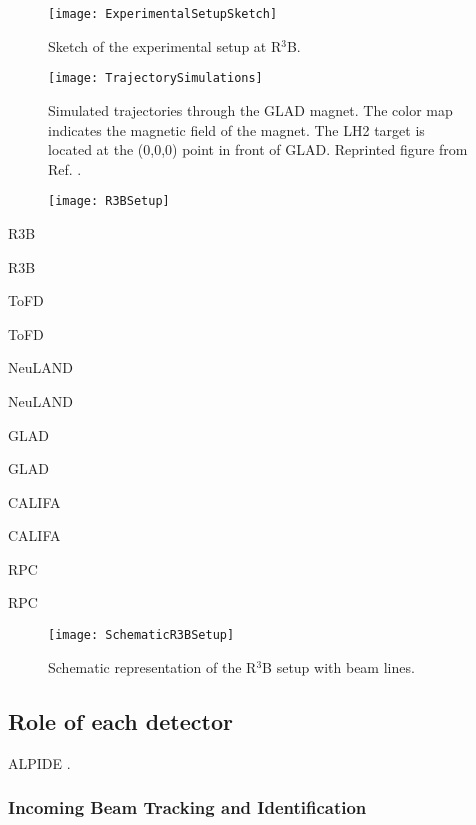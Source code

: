 \begin{figure}
	\texttt{[image: ExperimentalSetupSketch]}
	\caption{Sketch of the experimental setup at R$^3$B.} %
	\label{fig:ExperimentalSetupSketch}
\end{figure}

\begin{figure}
	\texttt{[image: TrajectorySimulations]}
	\caption{Simulated trajectories through the GLAD magnet. The color map indicates the magnetic
		field of the magnet. The LH2 target is located at the (0,0,0) point in front of GLAD. Reprinted figure from Ref. \cite{panin2024neutron}.}
	\label{fig:TrajectorySimulations}
\end{figure}



\begin{newpdflayout}{210mm}{297mm}%
	
	\begin{figure}
		\texttt{[image: R3BSetup]}
		\caption{}
		\label{fig:R3B_Setup}
	\end{figure}

\end{newpdflayout}

\gls{R3B}

\gls{R3B}

\gls{ToFD}

\gls{ToFD}

\gls{NeuLAND}

\gls{NeuLAND}

\gls{GLAD}

\gls{GLAD}

\gls{CALIFA}

\gls{CALIFA}

\gls{RPC}

\gls{RPC}
\begin{figure}
	\texttt{[image: SchematicR3BSetup]}
	\caption{Schematic representation of the R$^3$B setup with beam lines.}
	\label{fig:R3BSetup}
\end{figure}



\subsection{Role of each detector}

ALPIDE \cite{mager_alpide_2016}.

\subsubsection{Incoming Beam Tracking and Identification}

